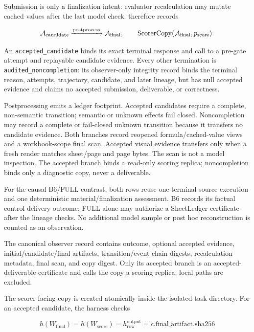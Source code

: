 Submission is only a finalization intent: evaluator recalculation may mutate
cached values after the last model check. \method therefore records

\begin{equation}
  \mathcal{A}_{\mathrm{candidate}} \xrightarrow{\text{postprocess}}
  \mathcal{A}_{\mathrm{final}},\qquad
  \operatorname{ScorerCopy}(\mathcal{A}_{\mathrm{final}},p_{\mathrm{score}}).
\end{equation}

An \texttt{accepted\_candidate} binds its exact terminal response and call to a
pre-gate attempt and replayable candidate evidence. Every other termination is
\texttt{audited\_noncompletion}: its observer-only integrity record binds the
terminal reason, attempts, trajectory, candidate, and later lineage, but has
null accepted evidence and claims no accepted submission, deliverable, or
correctness.

Postprocessing emits a ledger footprint. Accepted candidates require a complete,
non-semantic transition; semantic or unknown effects fail closed. Noncompletion
may record a complete or fail-closed unknown transition because it transfers no
candidate evidence. Both branches record reopened formula/cached-value views
and a workbook-scope final scan. Accepted visual evidence transfers only when a
fresh render matches sheet/page and page bytes. The scan is not a model
inspection. The accepted branch binds a read-only scoring replica; noncompletion
binds only a diagnostic copy, never a deliverable.

For the causal B6/FULL contrast, both rows reuse one terminal source execution
and one deterministic material/finalization assessment. B6 records its factual
control delivery outcome; FULL alone may authorize a SheetLedger certificate
after the lineage checks. No additional model sample or post hoc reconstruction
is counted as an observation.

The canonical observer record contains outcome, optional accepted evidence,
initial/candidate/final artifacts, transition/event-chain digests,
recalculation metadata, final scan, and copy digest. Only its accepted branch
is an accepted-deliverable certificate and calls the copy a scoring replica;
local paths are excluded.

The scorer-facing copy is created atomically inside the isolated task
directory. For an accepted candidate, the harness checks

\begin{equation}
  h(W_{\mathrm{final}})=h(W_{\mathrm{score}})
  =h_{\mathrm{row}}^{\mathrm{output}}
  =c.\mathrm{final\_artifact.sha256}
\end{equation}

